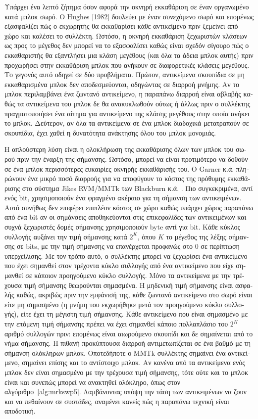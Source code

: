 \begin{greek}
Υπάρχει ένα λεπτό ζήτημα όσον αφορά την οκνηρή εκκαθάριση σε
έναν οργανωμένο κατά μπλοκ σωρό. Ο Hughes [1982] δουλεύει με 
έναν συνεχόμενο σωρό και επομένως εξασφαλίζει πώς ο εκχωρητής θα
εκκαθαρίσει κάθε αντικείμενο πριν ξεμείνει από χώρο και καλέσει
το συλλέκτη. Ωστόσο, η οκνηρή εκκαθάριση ξεχωριστών κλάσεων
ως προς το μέγεθος δεν μπορεί να το εξασφαλίσει καθώς είναι σχεδόν
σίγουρο πώς ο εκκαθαριστής θα εξαντλήσει μια κλάση μεγέθους (και
όλα τα άδεια μπλοκ αυτής) πριν προχωρήσει στην εκκαθάριση μπλοκ
που ανήκουν σε διαφορετικές κλάσεις μεγέθους. Το γεγονός αυτό
οδηγεί σε δύο προβλήματα. Πρώτον, αντικείμενα σκουπίδια σε μη
εκκαθαρισμένα μπλοκ δεν αποδεσμεύονται, οδηγώντας σε διαρροή 
μνήμης. Αν το μπλοκ περιλαμβάνει ένα ζωντανό αντικείμενο, η 
παραπάνω διαρροή είναι αβλαβής καθώς τα αντικείμενα του μπλοκ 
δε θα ανακυκλωθούν ούτως ή άλλως πριν ο συλλέκτης πραγματοποιήσει
ένα αίτημα για αντικείμενο της κλάσης μεγέθους στην οποία ανήκει
το μπλοκ. Δεύτερον, αν όλα τα αντικείμενα σε ένα μπλοκ διαδοχικά
μετατραπούν σε σκουπίδια, έχει χαθεί η δυνατότητα ανάκτησης όλου
του μπλοκ μονομιάς.

Η απλούστερη λύση είναι η ολοκλήρωση της εκκαθάρισης όλων των
μπλοκ του σωρού πριν την έναρξη της σήμανσης. Ωστόσο, μπορεί
να είναι προτιμότερο να δοθούν σε ένα μπλοκ περισσότερες ευκαιρίες
οκνηρής εκκαθάρισής του. Ο Garner κ.ά. \cite{DBLP:conf/iwmm/GarnerBF07}
πληρώνουν ένα μικρό ποσό διαρροής για να αποφύγουν το κόστος
της πρόθυμης εκκαθάρισης στο σύστημα Jikes RVM/MMTk των Blackburn
κ.ά. \cite{DBLP:conf/iwmm/BlackburnH04}. Πιο συγκεκριμένα, αντί
ενός bit, χρησιμοποιούν ένα φραγμένο ακέραιο για τη σήμανση των
αντικειμένων. Αυτό συνήθως δεν επιφέρει επιπλέον κόστος σε χώρο
καθώς υπάρχει χώρος παραπάνω από ένα bit αν οι σημάνσεις αποθηκεύονται
στις επικεφαλίδες των αντικειμένων και συχνά ξεχωριστές δομές
σήμανσης χρησιμοποιούν byte αντί για bit. Κάθε κύκλος συλλογής
αυξάνει την τιμή σήμανσης κατά $2^K$, όπου $K$ το μέγεθος της
λέξης σήμανσης σε bits, με την τιμή σήμανσης να επανέρχεται
προφανώς στο $0$ σε περίπτωση υπερχείλισης. Με τον τρόπο αυτό,
ο συλλέκτης μπορεί να ξεχωρίσει ένα αντικείμενο που έχει σημανθεί
στον τρέχοντα κύκλο συλλογής από ένα αντικείμενο που είχε
σημανθεί σε κάποιον προηγούμενο κύκλο συλλογής. Μόνο τα αντικείμενα
με την τρέχουσα τιμή σήμανσης θεωρούνται σημασμένα. Η μηδενική
τιμή σήμανσης είναι ασφαλής καθώς, ακριβώς πριν την εμφάνισή
της, κάθε ζωντανό αντικείμενο στο σωρό είναι είτε μη σημασμένο
(η μνήμη του εκχωρήθηκε μετά τον προηγούμενο κύκλο συλλογής),
είτε έχει τη μέγιστη τιμή σήμανσης. Κάθε αντικείμενο που είναι
σημασμένο με την επόμενη τιμή σήμανσης πρέπει να έχει σημανθεί
κάποιο πολλαπλάσιο του $2^K$ αριθμό συλλογών πριν: επομένως
είναι αιωρούμενο σκουπίδι και δε σημαίνεται από το νήμα σήμανσης.
Η πιθανή προκύπτουσα διαρροή αντιμετωπίζεται σε ένα βαθμό
με τη σήμανση ολόκληρων μπλοκ. Οποτεδήποτε ο MMTk συλλέκτης
σημαίνει ένα αντικείμενο, σημαίνει επίσης και το αντίστοιχο
μπλοκ. Αν κανένα από τα αντικείμενα ενός μπλοκ δεν είναι
σημασμένο με την τρέχουσα τιμή σήμανσης, τότε ούτε και το
μπλοκ είναι και συνεπώς μπορεί να ανακτηθεί ολόκληρο, όπως
στον αλγόριθμο~\ref{alg:mrkswp5}. Λαμβάνοντας υπόψη την τάση
των αντικειμένων να ζουν και να πεθαίνουν σε συστάδες,
αναμένει κανείς πώς η παραπάνω τεχνική είναι αποδοτική.


\end{greek}
